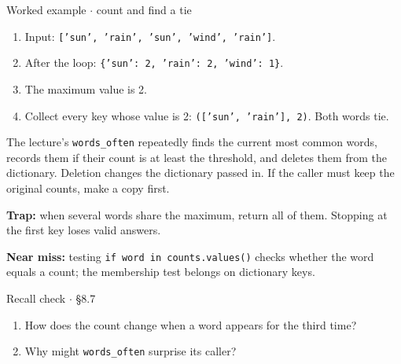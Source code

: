 \documentclass[11pt]{article}
\begin{document}
\begin{keepsection}
\begin{workedbox}{Worked example \ensuremath{\cdot} count and find a tie}
\begin{enumerate}
\item Input: \texttt{['sun', 'rain', 'sun', 'wind', 'rain']}.
\item After the loop: \texttt{\{'sun': 2, 'rain': 2, 'wind': 1\}}.
\item The maximum value is 2.
\item Collect every key whose value is 2: \texttt{(['sun', 'rain'], 2)}. Both words tie.
\end{enumerate}
\end{workedbox}

The lecture’s \texttt{words\_often} repeatedly finds the current most common words, records them if their count is at least the threshold, and deletes them from the dictionary. Deletion changes the dictionary passed in. If the caller must keep the original counts, make a copy first.

\begin{notebox}\textbf{Trap:} when several words share the maximum, return all of them. Stopping at the first key loses valid answers.\end{notebox}

\begin{notebox}\textbf{Near miss:} testing \texttt{if word in counts.values()} checks whether the word equals a count; the membership test belongs on dictionary keys.\end{notebox}

\begin{recallbox}{Recall check \ensuremath{\cdot} §8.7}
\begin{enumerate}
\item How does the count change when a word appears for the third time?
\item Why might \texttt{words\_often} surprise its caller?
\end{enumerate}

\end{recallbox}
\end{keepsection}
\end{document}
